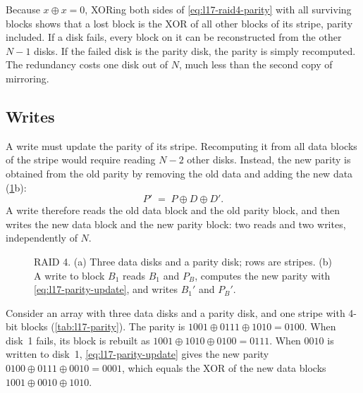 \documentclass[../main.tex]{subfiles}
\begin{document}
Because $x \oplus x = 0$, XORing both sides of \cref{eq:l17-raid4-parity}
with all surviving blocks shows that a lost block is the XOR of all other
blocks of its stripe, parity included.
If a disk fails, every block on it
can be reconstructed from the other $N-1$ disks.  If the failed disk is the
parity disk, the parity is simply recomputed.  The redundancy costs one disk
out of $N$, much less than the second copy of mirroring.

\subsection{Writes}

A write must update the parity of its stripe.  Recomputing it from all data
blocks of the stripe would require reading $N-2$ other disks.  Instead, the
new parity is obtained from the old parity by removing the old data and
adding the new data (\cref{fig:l17-raid4-write}b):
\begin{equation}
  P' \;=\; P \oplus D \oplus D' .
  \label{eq:l17-parity-update}
\end{equation}
A write therefore reads the old data block and the old parity block, and
then writes the new data block and the new parity block: two reads and two
writes, independently of $N$.

\begin{figure}[htbp]
  \centering
  
  \caption{RAID 4.  (a) Three data disks and a parity disk; rows are stripes.
    (b) A write to block $B_1$ reads $B_1$ and $P_B$, computes the new
    parity with \cref{eq:l17-parity-update}, and writes $B_1'$ and $P_B'$.}
  \label{fig:l17-raid4-write}
\end{figure}

\begin{example}
  \label{ex:l17-parity}
  Consider an array with three data disks and a parity disk, and one stripe
  with 4-bit blocks (\cref{tab:l17-parity}).  The parity is
  $1001 \oplus 0111 \oplus 1010 = 0100$.  When disk~1 fails, its block is
  rebuilt as $1001 \oplus 1010 \oplus 0100 = 0111$.  When $0010$ is written
  to disk~1, \cref{eq:l17-parity-update} gives the new parity
  $0100 \oplus 0111 \oplus 0010 = 0001$, which equals the XOR of the new data
  blocks $1001 \oplus 0010 \oplus 1010$.
\end{example}
\end{document}
